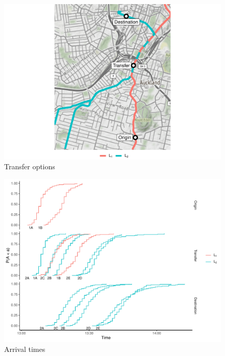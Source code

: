 \begin{knitrout}
\color{fgcolor}\begin{figure}

{\centering \includegraphics[width=\textwidth]{figure/eta_journey_transfer_prep-1} 

}

\caption[Transfer options]{Transfer options}\label{fig:eta_journey_transfer_prep}
\end{figure}


\end{knitrout}



\begin{knitrout}
\color{fgcolor}\begin{figure}

{\centering \includegraphics[width=\textwidth]{figure/eta_journey_transfer_graph-1} 

}

\caption[Arrival times]{Arrival times}\label{fig:eta_journey_transfer_graph}
\end{figure}


\end{knitrout}


